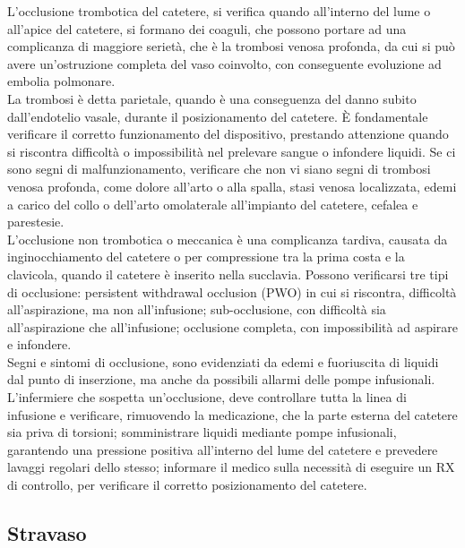 L’occlusione trombotica del catetere, si verifica quando all’interno del lume o all’apice del catetere, si formano dei 
coaguli, che possono portare ad una complicanza di maggiore serietà, che è la trombosi venosa profonda, da cui si può 
avere un’ostruzione completa del vaso coinvolto, con conseguente evoluzione ad embolia polmonare.\\ La trombosi è 
detta parietale, quando è una conseguenza del danno subito dall'endotelio vasale, durante il posizionamento del 
catetere. È fondamentale verificare il corretto funzionamento del dispositivo, prestando attenzione quando si 
riscontra difficoltà o impossibilità nel prelevare sangue o infondere liquidi. Se ci sono segni di malfunzionamento, 
verificare che non vi siano segni di trombosi venosa profonda, come dolore all’arto o alla spalla, stasi venosa 
localizzata, edemi a carico del collo o dell’arto omolaterale all’impianto del catetere, cefalea e parestesie.\\
L’occlusione non trombotica o meccanica è una complicanza tardiva, causata da inginocchiamento del catetere o 
per compressione tra la prima costa e la clavicola, quando il catetere è inserito nella succlavia. Possono verificarsi 
tre tipi di occlusione: persistent withdrawal occlusion (PWO) in cui si riscontra, difficoltà all’aspirazione, ma non 
all’infusione; sub-occlusione, con difficoltà sia all’aspirazione che all’infusione; occlusione completa, con 
impossibilità ad aspirare e infondere\cite{AIOMCVC}.\\
Segni e sintomi di occlusione, sono evidenziati da edemi e fuoriuscita di liquidi dal punto di inserzione, ma 
anche da possibili allarmi delle pompe infusionali.\\ L’infermiere che sospetta un’occlusione, deve controllare tutta la 
linea di infusione e verificare, rimuovendo la medicazione, che la parte esterna del catetere sia priva di torsioni; 
somministrare liquidi mediante pompe infusionali, garantendo una pressione positiva all’interno del lume del catetere e 
prevedere lavaggi regolari dello stesso; informare il medico sulla necessità di eseguire un RX di controllo, per 
verificare il corretto posizionamento del catetere.

\subsection{Stravaso}

